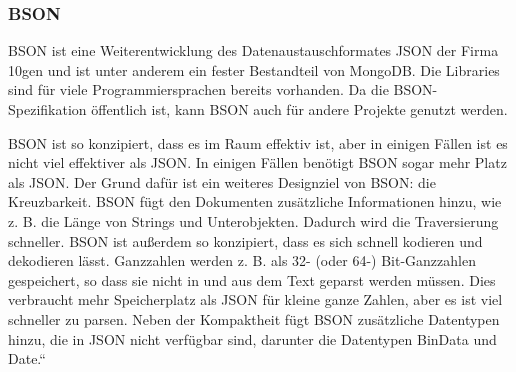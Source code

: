\subsubsection{BSON}

BSON ist eine Weiterentwicklung des Datenaustauschformates JSON der Firma 10gen und ist unter anderem ein fester Bestandteil von MongoDB. Die Libraries sind für viele Programmiersprachen bereits vorhanden. Da die BSON-Spezifikation öffentlich ist, kann BSON auch für andere Projekte genutzt werden.\cite{thKloeln}

BSON ist so konzipiert, dass es im Raum effektiv ist, aber in einigen Fällen ist es nicht viel effektiver als JSON. In einigen Fällen benötigt BSON sogar mehr Platz als JSON. Der Grund dafür ist ein weiteres Designziel von BSON: die Kreuzbarkeit. BSON fügt den Dokumenten zusätzliche Informationen hinzu, wie z. B. die Länge von Strings und Unterobjekten. Dadurch wird die Traversierung schneller.\cite{bson} BSON ist außerdem so konzipiert, dass es sich schnell kodieren und dekodieren lässt. Ganzzahlen werden z. B. als 32- (oder 64-) Bit-Ganzzahlen gespeichert, so dass sie nicht in und aus dem Text geparst werden müssen. Dies verbraucht mehr Speicherplatz als JSON für kleine ganze Zahlen, aber es ist viel schneller zu parsen. Neben der Kompaktheit fügt BSON zusätzliche Datentypen hinzu, die in JSON nicht verfügbar sind, darunter die Datentypen BinData und Date.“